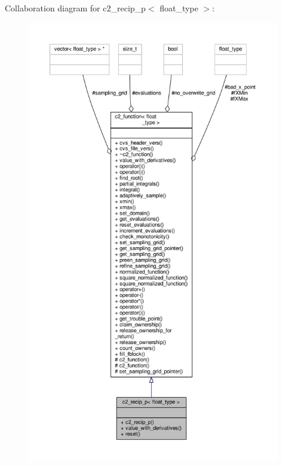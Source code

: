 Collaboration diagram for c2\+\_\+recip\+\_\+p$<$ float\+\_\+type $>$\+:
\nopagebreak
\begin{figure}[H]
\begin{center}
\leavevmode
\includegraphics[height=550pt]{classc2__recip__p__coll__graph}
\end{center}
\end{figure}
